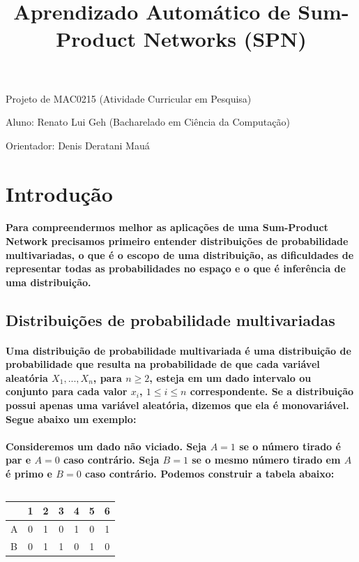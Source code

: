 \documentclass[a4paper,10pt]{article}
\title{\textbf{Aprendizado Automático de Sum-Product Networks (SPN)}}
\theoremstyle{plain}
\begin{document}
\date{}
\author{}
\vspace*{-40pt}
{\let\newpage\relax\maketitle}

Projeto de MAC0215 (Atividade Curricular em Pesquisa)

Aluno: Renato Lui Geh (Bacharelado em Ciência da Computação)

Orientador: Denis Deratani Mauá

\section{Introdução}

\paragraph{
  Para compreendermos melhor as aplicações de uma Sum-Product Network precisamos primeiro entender distribuições
de probabilidade multivariadas, o que é o escopo de uma distribuição, as dificuldades de representar todas as 
probabilidades no espaço e o que é inferência de uma distribuição.
}

\subsection{Distribuições de probabilidade multivariadas}

\paragraph{
  Uma distribuição de probabilidade multivariada é uma distribuição de probabilidade que resulta na probabilidade 
de que cada variável aleatória $X_1,...,X_n$, para $n\geq{2}$, esteja em um dado intervalo ou conjunto para cada valor 
$x_i$, $1\leq{i}\leq{n}$ correspondente. Se a distribuição possui apenas uma variável aleatória, dizemos que ela é 
monovariável. Segue abaixo um exemplo:
}

\paragraph{
  Consideremos um dado não viciado. Seja $A=1$ se o número tirado é par e $A=0$ caso contrário. Seja $B=1$ se o
mesmo número tirado em $A$ é primo e $B=0$ caso contrário. Podemos construir a tabela abaixo:
}

\begin{table}[h]
\caption{}
\begin{tabular}{l | *{6}{c}}
  & 1 & 2 & 3 & 4 & 5 & 6 \\
\hline
A & 0 & 1 & 0 & 1 & 0 & 1 \\
B & 0 & 1 & 1 & 0 & 1 & 0 \\
\end{tabular}
\end{table}
\end{document}
